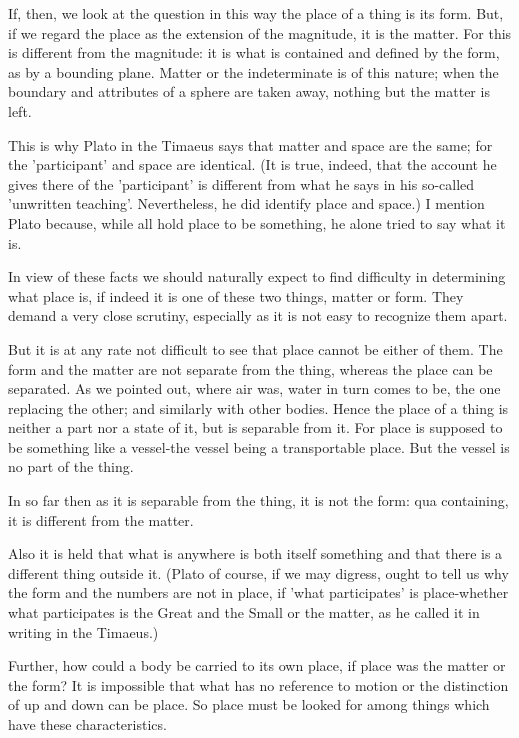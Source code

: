 If, then, we look at the question in this way the place of a thing
is its form. But, if we regard the place as the extension of the magnitude,
it is the matter. For this is different from the magnitude: it is
what is contained and defined by the form, as by a bounding plane.
Matter or the indeterminate is of this nature; when the boundary and
attributes of a sphere are taken away, nothing but the matter is left.

This is why Plato in the Timaeus says that matter and space are the
same; for the 'participant' and space are identical. (It is true,
indeed, that the account he gives there of the 'participant' is different
from what he says in his so-called 'unwritten teaching'. Nevertheless,
he did identify place and space.) I mention Plato because, while all
hold place to be something, he alone tried to say what it is.

In view of these facts we should naturally expect to find difficulty
in determining what place is, if indeed it is one of these two things,
matter or form. They demand a very close scrutiny, especially as it
is not easy to recognize them apart. 

But it is at any rate not difficult to see that place cannot be either
of them. The form and the matter are not separate from the thing,
whereas the place can be separated. As we pointed out, where air was,
water in turn comes to be, the one replacing the other; and similarly
with other bodies. Hence the place of a thing is neither a part nor
a state of it, but is separable from it. For place is supposed to
be something like a vessel-the vessel being a transportable place.
But the vessel is no part of the thing. 

In so far then as it is separable from the thing, it is not the form:
qua containing, it is different from the matter. 

Also it is held that what is anywhere is both itself something and
that there is a different thing outside it. (Plato of course, if we
may digress, ought to tell us why the form and the numbers are not
in place, if 'what participates' is place-whether what participates
is the Great and the Small or the matter, as he called it in writing
in the Timaeus.) 

Further, how could a body be carried to its own place, if place was
the matter or the form? It is impossible that what has no reference
to motion or the distinction of up and down can be place. So place
must be looked for among things which have these characteristics.

